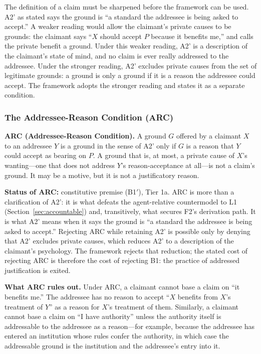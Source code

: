 \documentclass[11pt]{article}
\def\ensuremath#1{#1}%
\def\mathrm#1{#1}%
\newcommand{\Atwo}{\texorpdfstring{\ensuremath{\mathrm{A2}'}}{A2'}}
\begin{document}
The definition of a claim must be sharpened before the framework can be used. \Atwo{} as stated says the ground is ``a standard the addressee is being asked to accept.'' A weaker reading would allow the claimant's private causes to be grounds: the claimant says ``$X$ should accept $P$ because it benefits me,'' and calls the private benefit a ground. Under this weaker reading, \Atwo{} is a description of the claimant's state of mind, and no claim is ever really addressed to the addressee. Under the stronger reading, \Atwo{} excludes private causes from the set of legitimate grounds: a ground is only a ground if it is a reason the addressee could accept. The framework adopts the stronger reading and states it as a separate condition.

\subsubsection{The Addressee-Reason Condition (ARC)}
\begin{paperbox}
\textbf{ARC (Addressee-Reason Condition).} A ground $G$ offered by a claimant $X$ to an addressee $Y$ is a ground in the sense of \Atwo{} only if $G$ is a reason that $Y$ could accept as bearing on $P$. A ground that is, at most, a private cause of $X$'s wanting---one that does not address $Y$'s reason-acceptance at all---is not a claim's ground. It may be a motive, but it is not a justificatory reason.
\end{paperbox}

\textbf{Status of ARC:} constitutive premise (B1$'$), Tier 1a. ARC is more than a clarification of \Atwo{}: it is what defeats the agent-relative countermodel to L1 (Section~\ref{sec:accountable}) and, transitively, what secures F2's derivation path. It is what \Atwo{} means when it says the ground is ``a standard the addressee is being asked to accept.'' Rejecting ARC while retaining \Atwo{} is possible only by denying that \Atwo{} excludes private causes, which reduces \Atwo{} to a description of the claimant's psychology. The framework rejects that reduction; the stated cost of rejecting ARC is therefore the cost of rejecting B1: the practice of addressed justification is exited.

\textbf{What ARC rules out.} Under ARC, a claimant cannot base a claim on ``it benefits me.'' The addressee has no reason to accept ``$X$ benefits from $X$'s treatment of $Y$'' as a reason for $X$'s treatment of them. Similarly, a claimant cannot base a claim on ``I have authority'' unless the authority itself is addressable to the addressee as a reason---for example, because the addressee has entered an institution whose rules confer the authority, in which case the addressable ground is the institution and the addressee's entry into it.
\end{document}
